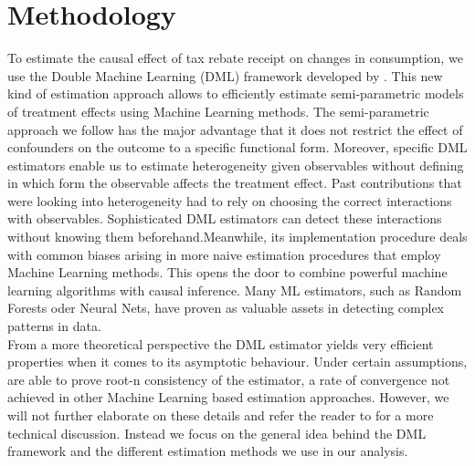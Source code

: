 \section{Methodology} \label{sec:methodology}
To estimate the causal effect of tax rebate receipt on changes in consumption, we use the Double Machine Learning (DML) framework developed by \cite{DML2017}. This new kind of estimation approach allows to efficiently estimate semi-parametric models of treatment effects using Machine Learning methods. The semi-parametric approach we follow has the major advantage that it does not restrict the effect of confounders on the outcome to a specific functional form. Moreover, specific DML estimators enable us to estimate heterogeneity given observables without defining in which form the observable affects the treatment effect. Past contributions that were looking into heterogeneity had to rely on choosing the correct interactions with observables. Sophisticated DML estimators can detect these interactions without knowing them beforehand.Meanwhile, its implementation procedure deals with common biases arising in more naive estimation procedures that employ Machine Learning methods. This opens the door to combine powerful machine learning algorithms with causal inference. Many ML estimators, such as Random Forests oder Neural Nets, have proven as valuable assets in detecting complex patterns in data.\\
From a more theoretical perspective the DML estimator yields very efficient properties when it comes to its asymptotic behaviour. Under certain assumptions, \cite{DML2017} are able to prove root-n consistency of the estimator, a rate of convergence not achieved in other Machine Learning based estimation approaches. However, we will not further elaborate on these details and refer the reader to \cite{DML2017} for a more technical discussion. Instead we focus on the general idea behind the DML framework and the different estimation methods we use in our analysis.

